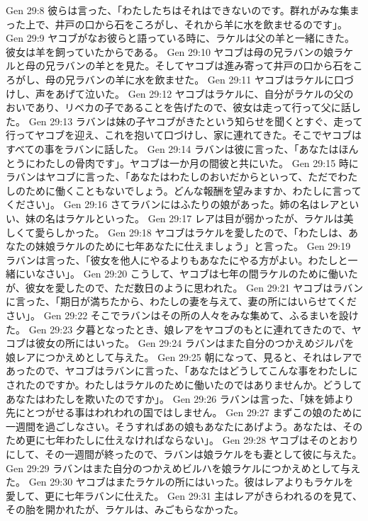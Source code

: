 Gen 29:8  彼らは言った、「わたしたちはそれはできないのです。群れがみな集まった上で、井戸の口から石をころがし、それから羊に水を飲ませるのです」。
Gen 29:9  ヤコブがなお彼らと語っている時に、ラケルは父の羊と一緒にきた。彼女は羊を飼っていたからである。
Gen 29:10  ヤコブは母の兄ラバンの娘ラケルと母の兄ラバンの羊とを見た。そしてヤコブは進み寄って井戸の口から石をころがし、母の兄ラバンの羊に水を飲ませた。
Gen 29:11  ヤコブはラケルに口づけし、声をあげて泣いた。
Gen 29:12  ヤコブはラケルに、自分がラケルの父のおいであり、リベカの子であることを告げたので、彼女は走って行って父に話した。
Gen 29:13  ラバンは妹の子ヤコブがきたという知らせを聞くとすぐ、走って行ってヤコブを迎え、これを抱いて口づけし、家に連れてきた。そこでヤコブはすべての事をラバンに話した。
Gen 29:14  ラバンは彼に言った、「あなたはほんとうにわたしの骨肉です」。ヤコブは一か月の間彼と共にいた。
Gen 29:15  時にラバンはヤコブに言った、「あなたはわたしのおいだからといって、ただでわたしのために働くこともないでしょう。どんな報酬を望みますか、わたしに言ってください」。
Gen 29:16  さてラバンにはふたりの娘があった。姉の名はレアといい、妹の名はラケルといった。
Gen 29:17  レアは目が弱かったが、ラケルは美しくて愛らしかった。
Gen 29:18  ヤコブはラケルを愛したので、「わたしは、あなたの妹娘ラケルのために七年あなたに仕えましょう」と言った。
Gen 29:19  ラバンは言った、「彼女を他人にやるよりもあなたにやる方がよい。わたしと一緒にいなさい」。
Gen 29:20  こうして、ヤコブは七年の間ラケルのために働いたが、彼女を愛したので、ただ数日のように思われた。
Gen 29:21  ヤコブはラバンに言った、「期日が満ちたから、わたしの妻を与えて、妻の所にはいらせてください」。
Gen 29:22  そこでラバンはその所の人々をみな集めて、ふるまいを設けた。
Gen 29:23  夕暮となったとき、娘レアをヤコブのもとに連れてきたので、ヤコブは彼女の所にはいった。
Gen 29:24  ラバンはまた自分のつかえめジルパを娘レアにつかえめとして与えた。
Gen 29:25  朝になって、見ると、それはレアであったので、ヤコブはラバンに言った、「あなたはどうしてこんな事をわたしにされたのですか。わたしはラケルのために働いたのではありませんか。どうしてあなたはわたしを欺いたのですか」。
Gen 29:26  ラバンは言った、「妹を姉より先にとつがせる事はわれわれの国ではしません。
Gen 29:27  まずこの娘のために一週間を過ごしなさい。そうすればあの娘もあなたにあげよう。あなたは、そのため更に七年わたしに仕えなければならない」。
Gen 29:28  ヤコブはそのとおりにして、その一週間が終ったので、ラバンは娘ラケルをも妻として彼に与えた。
Gen 29:29  ラバンはまた自分のつかえめビルハを娘ラケルにつかえめとして与えた。
Gen 29:30  ヤコブはまたラケルの所にはいった。彼はレアよりもラケルを愛して、更に七年ラバンに仕えた。
Gen 29:31  主はレアがきらわれるのを見て、その胎を開かれたが、ラケルは、みごもらなかった。
